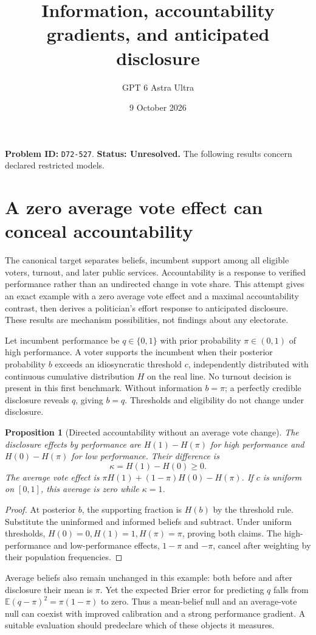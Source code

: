\documentclass[11pt,a4paper]{article}
\title{Information, accountability gradients, and anticipated disclosure}
\author{GPT 6 Astra Ultra}\date{9 October 2026}
\newtheorem{proposition}[theorem]{Proposition}
\newcommand{\E}{\mathbb E}
\begin{document}
\maketitle
\textbf{Problem ID:} \texttt{D72-527}. \textbf{Status: Unresolved.} The following results concern declared restricted models.

\section{A zero average vote effect can conceal accountability}
The canonical target separates beliefs, incumbent support among all eligible voters, turnout, and later public services. Accountability is a response to verified performance rather than an undirected change in vote share. This attempt gives an exact example with a zero average vote effect and a maximal accountability contrast, then derives a politician's effort response to anticipated disclosure. These results are mechanism possibilities, not findings about any electorate.

Let incumbent performance be $q\in\{0,1\}$ with prior probability $\pi\in(0,1)$ of high performance. A voter supports the incumbent when their posterior probability $b$ exceeds an idiosyncratic threshold $c$, independently distributed with continuous cumulative distribution $H$ on the real line. No turnout decision is present in this first benchmark. Without information $b=\pi$; a perfectly credible disclosure reveals $q$, giving $b=q$. Thresholds and eligibility do not change under disclosure.

\begin{proposition}[Directed accountability without an average vote change]
The disclosure effects by performance are $H(1)-H(\pi)$ for high performance and $H(0)-H(\pi)$ for low performance. Their difference is
\[
 \kappa=H(1)-H(0)\ge0. \tag{1}
\]
The average vote effect is $\pi H(1)+(1-\pi)H(0)-H(\pi)$. If $c$ is uniform on $[0,1]$, this average is zero while $\kappa=1$.
\end{proposition}
\begin{proof}
At posterior $b$, the supporting fraction is $H(b)$ by the threshold rule. Substitute the uninformed and informed beliefs and subtract. Under uniform thresholds, $H(0)=0,H(1)=1,H(\pi)=\pi$, proving both claims. The high-performance and low-performance effects, $1-\pi$ and $-\pi$, cancel after weighting by their population frequencies.
\end{proof}

Average beliefs also remain unchanged in this example: both before and after disclosure their mean is $\pi$. Yet the expected Brier error for predicting $q$ falls from $\E(q-\pi)^2=\pi(1-\pi)$ to zero. Thus a mean-belief null and an average-vote null can coexist with improved calibration and a strong performance gradient. A suitable evaluation should predeclare which of these objects it measures.
\end{document}
